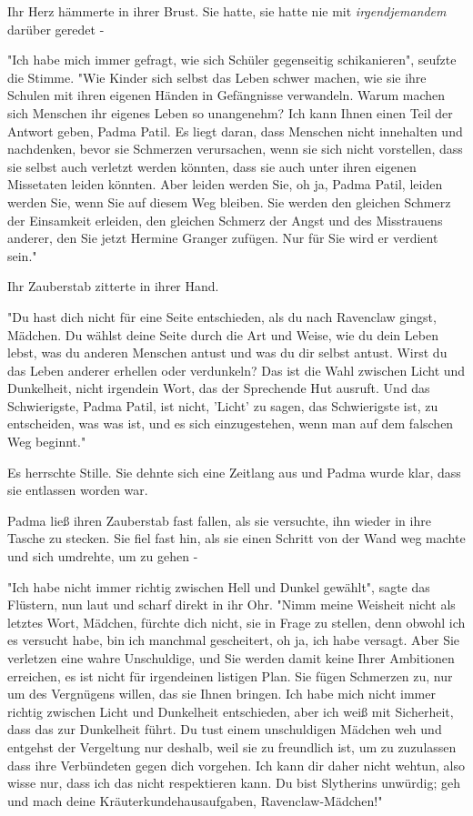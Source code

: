 {Ihr Herz hämmerte in ihrer Brust. Sie hatte, sie hatte nie mit \emph{irgendjemandem} darüber geredet -

"Ich habe mich immer gefragt, wie sich Schüler gegenseitig schikanieren", seufzte die Stimme. "Wie Kinder sich selbst das Leben schwer machen, wie sie ihre Schulen mit ihren eigenen Händen in Gefängnisse verwandeln. Warum machen sich Menschen ihr eigenes Leben so unangenehm? Ich kann Ihnen einen Teil der Antwort geben, Padma Patil. Es liegt daran, dass Menschen nicht innehalten und nachdenken, bevor sie Schmerzen verursachen, wenn sie sich nicht vorstellen, dass sie selbst auch verletzt werden könnten, dass sie auch unter ihren eigenen Missetaten leiden könnten. Aber leiden werden Sie, oh ja, Padma Patil, leiden werden Sie, wenn Sie auf diesem Weg bleiben. Sie werden den gleichen Schmerz der Einsamkeit erleiden, den gleichen Schmerz der Angst und des Misstrauens anderer, den Sie jetzt Hermine Granger zufügen. Nur für Sie wird er verdient sein."

Ihr Zauberstab zitterte in ihrer Hand.

"Du hast dich nicht für eine Seite entschieden, als du nach Ravenclaw gingst, Mädchen. Du wählst deine Seite durch die Art und Weise, wie du dein Leben lebst, was du anderen Menschen antust und was du dir selbst antust. Wirst du das Leben anderer erhellen oder verdunkeln? Das ist die Wahl zwischen Licht und Dunkelheit, nicht irgendein Wort, das der Sprechende Hut ausruft. Und das Schwierigste, Padma Patil, ist nicht, 'Licht' zu sagen, das Schwierigste ist, zu entscheiden, was was ist, und es sich einzugestehen, wenn man auf dem falschen Weg beginnt."

Es herrschte Stille. Sie dehnte sich eine Zeitlang aus und Padma wurde klar, dass sie entlassen worden war.

Padma ließ ihren Zauberstab fast fallen, als sie versuchte, ihn wieder in ihre Tasche zu stecken. Sie fiel fast hin, als sie einen Schritt von der Wand weg machte und sich umdrehte, um zu gehen -

"Ich habe nicht immer richtig zwischen Hell und Dunkel gewählt", sagte das Flüstern, nun laut und scharf direkt in ihr Ohr. "Nimm meine Weisheit nicht als letztes Wort, Mädchen, fürchte dich nicht, sie in Frage zu stellen, denn obwohl ich es versucht habe, bin ich manchmal gescheitert, oh ja, ich habe versagt. Aber Sie verletzen eine wahre Unschuldige, und Sie werden damit keine Ihrer Ambitionen erreichen, es ist nicht für irgendeinen listigen Plan. Sie fügen Schmerzen zu, nur um des Vergnügens willen, das sie Ihnen bringen. Ich habe mich nicht immer richtig zwischen Licht und Dunkelheit entschieden, aber ich weiß mit Sicherheit, dass das zur Dunkelheit führt. Du tust einem unschuldigen Mädchen weh und entgehst der Vergeltung nur deshalb, weil sie zu freundlich ist, um zu zuzulassen dass ihre Verbündeten gegen dich vorgehen. Ich kann dir daher nicht wehtun, also wisse nur, dass ich das nicht respektieren kann. Du bist Slytherins unwürdig; geh und mach deine Kräuterkundehausaufgaben, Ravenclaw-Mädchen!"

}
